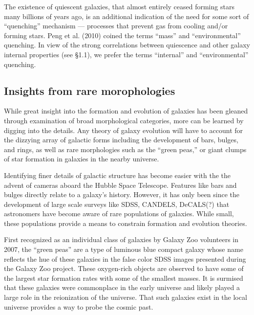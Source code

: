 The existence of quiescent galaxies, that almost entirely ceased forming stars many billions of years ago, is an additional indication of the need for some sort of “quenching” mechanism — processes that prevent gas from cooling and/or forming stars. Peng et al. (2010) coined the terms “mass” and “environmental” quenching. In view of the strong correlations between quiescence and other galaxy internal properties (see §1.1), we prefer the terms “internal” and “environmental” quenching.


\subsection{Insights from rare morophologies}
While great insight into the formation and evolution of galaxies has been gleaned through examination of broad morphological categories, more can be learned by digging into the details. Any theory of galaxy evolution will have to account for the dizzying array of galactic forms including the development of bars, bulges, and rings, as well as rare morphologies such as the ``green peas,'' or giant clumps of star formation in galaxies in the nearby universe.

Identifying finer details of galactic structure has become easier with the the advent of cameras aboard the Hubble Space Telescope. Features like bars and bulges directly relate to a galaxy's history. However, it has only been since the development of large scale surveys like SDSS, CANDELS, DeCALS(?) that astronomers have become aware of rare populations of galaxies. While small, these populations provide a means to constrain formation and evolution theories. 

First recognized as an individual class of galaxies by Galaxy Zoo volunteers in 2007, the ``green peas'' are a type of luminous blue compact galaxy whose name reflects the hue of these galaxies in the false color SDSS images presented during the Galaxy Zoo project. These oxygen-rich objects are observed to have some of the largest star formation rates with some of the smallest masses. It is surmised that these galaxies were commonplace in the early universe and likely played a large role in the reionization of the universe. That such galaxies exist in the local universe provides a way to probe the cosmic past. 

